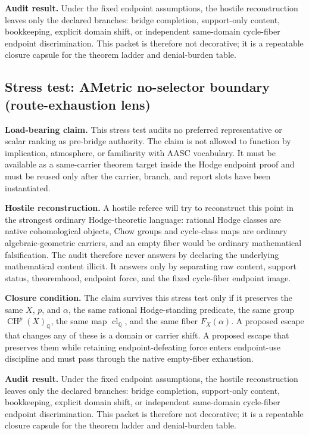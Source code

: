 \documentclass[11pt]{article}
\newcommand{\QQ}{\mathbb{Q}}
\newcommand{\CH}{\operatorname{CH}}
\newcommand{\clQ}{\operatorname{cl}_{\QQ}}
\begin{document}
\par\noindent\textbf{Audit result.} Under the fixed endpoint assumptions, the hostile reconstruction leaves only the declared branches: bridge completion, support-only content, bookkeeping, explicit domain shift, or independent same-domain cycle-fiber endpoint discrimination. This packet is therefore not decorative; it is a repeatable closure capsule for the theorem ladder and denial-burden table.


\subsection{Stress test: AMetric no-selector boundary (route-exhaustion lens)}

\par\noindent\textbf{Load-bearing claim.} This stress test audits no preferred representative or scalar ranking as pre-bridge authority. The claim is not allowed to function by implication, atmosphere, or familiarity with AASC vocabulary. It must be available as a same-carrier theorem target inside the Hodge endpoint proof and must be reused only after the carrier, branch, and report slots have been instantiated.

\par\noindent\textbf{Hostile reconstruction.} A hostile referee will try to reconstruct this point in the strongest ordinary Hodge-theoretic language: rational Hodge classes are native cohomological objects, Chow groups and cycle-class maps are ordinary algebraic-geometric carriers, and an empty fiber would be ordinary mathematical falsification. The audit therefore never answers by declaring the underlying mathematical content illicit. It answers only by separating raw content, support status, theoremhood, endpoint force, and the fixed cycle-fiber endpoint image.

\par\noindent\textbf{Closure condition.} The claim survives this stress test only if it preserves the same $X$, $p$, and $\alpha$, the same rational Hodge-standing predicate, the same group $\CH^p(X)_\QQ$, the same map $\clQ$, and the same fiber $F_X(\alpha)$. A proposed escape that changes any of these is a domain or carrier shift. A proposed escape that preserves them while retaining endpoint-defeating force enters endpoint-use discipline and must pass through the native empty-fiber exhaustion.

\par\noindent\textbf{Audit result.} Under the fixed endpoint assumptions, the hostile reconstruction leaves only the declared branches: bridge completion, support-only content, bookkeeping, explicit domain shift, or independent same-domain cycle-fiber endpoint discrimination. This packet is therefore not decorative; it is a repeatable closure capsule for the theorem ladder and denial-burden table.
\end{document}
